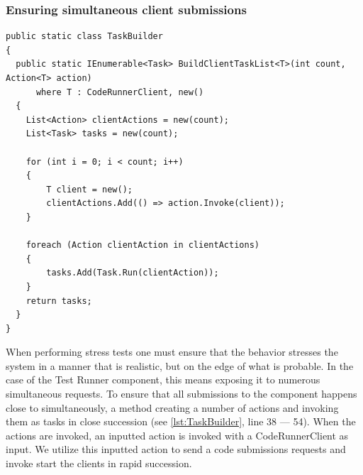 \subsubsection{Ensuring simultaneous client submissions}
\begin{lstlisting}[language=CSharp, escapechar=~, caption={C\# code showing the BuildClientTaskList method, which is used to build a number of actions which are executed simultaneously in a Task. }, label={lst:TaskBuilder}]
public static class TaskBuilder
{
  public static IEnumerable<Task> BuildClientTaskList<T>(int count, Action<T> action)
      where T : CodeRunnerClient, new()
  {
    List<Action> clientActions = new(count);
    List<Task> tasks = new(count);
    
    for (int i = 0; i < count; i++)
    {
        T client = new();
        clientActions.Add(() => action.Invoke(client));
    }

    foreach (Action clientAction in clientActions)
    {
        tasks.Add(Task.Run(clientAction));
    }
    return tasks;
  }
}
\end{lstlisting}
When performing stress tests one must ensure that the behavior stresses the system in a manner that is realistic, but on the edge of what is probable.
In the case of the Test Runner component, this means exposing it to numerous simultaneous requests. 
To ensure that all submissions to the component happens close to simultaneously, a method creating a number of actions and invoking them as tasks in close succession (see \ref{lst:TaskBuilder}, line 38 --- 54). 
When the actions are invoked, an inputted action is invoked with a CodeRunnerClient as input. 
We utilize this inputted action to send a code submissions requests and invoke start the clients in rapid succession.


